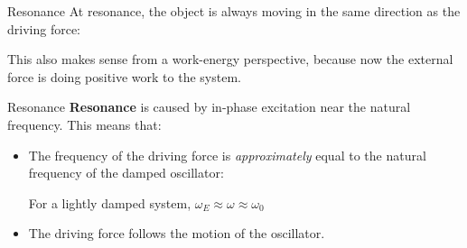 \documentclass[12pt,compress,aspectratio=169]{beamer}
\begin{document}
\begin{frame}{Resonance}
  At resonance, the object is always moving in the same direction as the
  driving force:

  \vspace{-.3in}{\large
    \begin{align*}
      v(t)&=A\omega_E\cos(\omega_E t)\\
      F_E(t)&=F\cos(\omega_E t)
    \end{align*}
  }

  This also makes sense from a work-energy perspective, because now the
  external force is doing positive work to the system.
\end{frame}



\begin{frame}{Resonance}
  \textbf{Resonance} is caused by in-phase excitation near the natural
  frequency. This means that:
  \begin{itemize}
  \item The frequency of the driving force is \emph{approximately} equal to the
    natural frequency of the damped oscillator:


    For a lightly damped system, $\omega_E\approx\omega\approx\omega_0$
  \item The driving force follows the motion of the oscillator.
  \end{itemize}
\end{frame}
\end{document}
